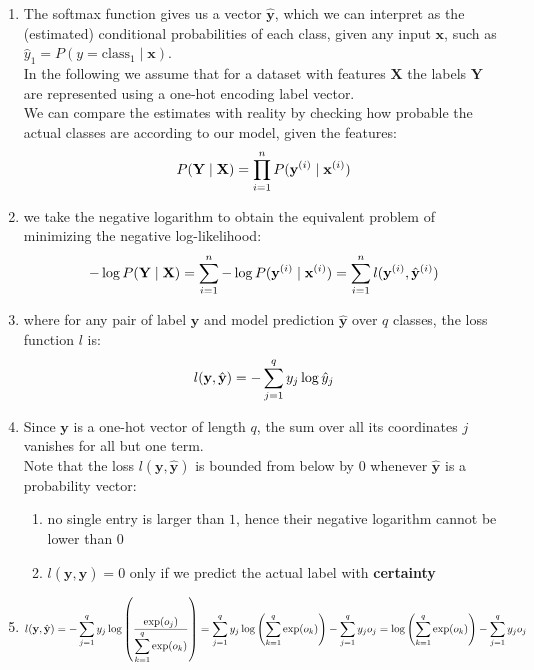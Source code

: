 \begin{enumerate}[itemsep=0.2cm]
    \item The softmax function gives us a vector $\hat{\mathbf{y}}$, which we can interpret as the (estimated) conditional probabilities of each class, given any input $\mathbf{x}$, such as $\hat{y}_1 = P(y=\textrm{class$_1$} \mid \mathbf{x})$.\\
    In the following we assume that for a dataset with features $\mathbf{X}$ the labels $\mathbf{Y}$ are represented using a one-hot encoding label vector.\\
    We can compare the estimates with reality by checking how probable the actual classes are according to our model, given the features:
    \[
        \hfill
        P(\mathbf{Y} \mid \mathbf{X}) 
        = \prod_{i=1}^n P(\mathbf{y}^{(i)} \mid \mathbf{x}^{(i)})
        \hfill
    \]

    \item we take the negative logarithm to obtain the equivalent problem of minimizing the negative log-likelihood:
    \[
        \hfill
        -\log P(\mathbf{Y} \mid \mathbf{X}) 
        = \dsum_{i=1}^n -\log P(\mathbf{y}^{(i)} \mid \mathbf{x}^{(i)})
        = \dsum_{i=1}^n l(\mathbf{y}^{(i)}, \hat{\mathbf{y}}^{(i)})
        \hfill
    \]

    \item where for any pair of label $\mathbf{y}$ and model prediction $\hat{\mathbf{y}}$ over $q$ classes, the loss function $l$ is:
    \[
        \hfill
        l(\mathbf{y}, \hat{\mathbf{y}}) = - \dsum_{j=1}^q y_j \log \hat{y}_j
        \hfill
    \]

    \item Since $\mathbf{y}$ is a one-hot vector of length $q$, the sum over all its coordinates $j$ vanishes for all but one term.\\
    Note that the loss $l(\mathbf{y}, \hat{\mathbf{y}})$ is bounded from below by $0$ whenever $\hat{\mathbf{y}}$ is a probability vector: 
    \begin{enumerate}
        \item no single entry is larger than $1$, hence their negative logarithm cannot be lower than $0$

        \item $l(\mathbf{y}, \hat{\mathbf{y}}) = 0$ only if we predict the actual label with \textbf{certainty}

    \end{enumerate}

    \item $
        l(\mathbf{y}, \hat{\mathbf{y}}) 
        = - \displaystyle\sum_{j=1}^q y_j \log \left(\frac{\exp(o_j)}{\displaystyle\sum_{k=1}^q \exp(o_k)}\right)
        = \displaystyle\sum_{j=1}^q y_j \log \left(\displaystyle\sum_{k=1}^q \exp(o_k)\right) - \displaystyle\sum_{j=1}^q y_j o_j
        = \log \left(\displaystyle\sum_{k=1}^q \exp(o_k)\right) - \displaystyle\sum_{j=1}^q y_j o_j
    $


\end{enumerate}
